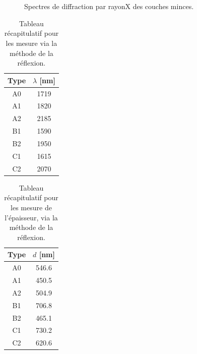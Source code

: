 \documentclass[a4paper,12pt,oneside]{article}
\begin{document}
\begin{figure}[!ht]
	\\
	\hfill
	\hfill
	\\
	\begin{center}
	\end{center}
	\caption{Spectres de diffraction par rayonX des couches minces.}
	\label{fig:diff_main}
\end{figure}

\begin{table}[ht]
   \centering
   \begin{tabular}{|c|c|}
	  \hline
      Type & $\lambda$ [nm]\\
      \hline
      A0 & 1719 \\
      A1 & 1820 \\
      A2 & 2185 \\
      B1 & 1590 \\
      B2 & 1950 \\
      C1 & 1615 \\
      C2 & 2070 \\
      \hline
   \end{tabular}
   \caption{Tableau récapitulatif pour les mesure via la méthode de la réflexion.}\label{tab:reflexion}
\end{table}

\begin{table}[ht]
   \centering
   \begin{tabular}{|c|c|}
	  \hline
      Type & $d$ [nm]\\
      \hline
      A0 & 546.6 \\
      A1 & 450.5 \\
      A2 & 504.9 \\
      B1 & 706.8 \\
      B2 & 465.1 \\
      C1 & 730.2 \\
      C2 & 620.6 \\
      \hline
   \end{tabular}
   \caption{Tableau récapitulatif pour les mesure de l'épaisseur, via la méthode de la réflexion.}\label{tab:epaisseur}
\end{table}
\end{document}
